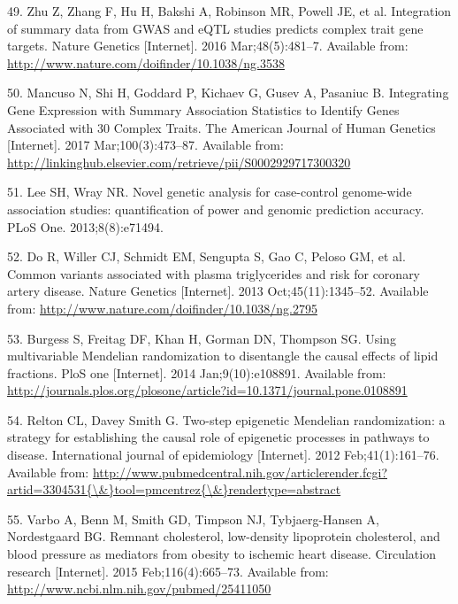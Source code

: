 \documentclass[]{article}
\begin{document}
\hypertarget{ref-Zhu2016}{}
49. Zhu Z, Zhang F, Hu H, Bakshi A, Robinson MR, Powell JE, et al.
Integration of summary data from GWAS and eQTL studies predicts complex
trait gene targets. Nature Genetics {[}Internet{]}. 2016
Mar;48(5):481--7. Available from:
\url{http://www.nature.com/doifinder/10.1038/ng.3538}

\hypertarget{ref-Mancuso2017}{}
50. Mancuso N, Shi H, Goddard P, Kichaev G, Gusev A, Pasaniuc B.
Integrating Gene Expression with Summary Association Statistics to
Identify Genes Associated with 30 Complex Traits. The American Journal
of Human Genetics {[}Internet{]}. 2017 Mar;100(3):473--87. Available
from:
\url{http://linkinghub.elsevier.com/retrieve/pii/S0002929717300320}

\hypertarget{ref-Lee2013c}{}
51. Lee SH, Wray NR. Novel genetic analysis for case-control genome-wide
association studies: quantification of power and genomic prediction
accuracy. PLoS One. 2013;8(8):e71494.

\hypertarget{ref-Do2013}{}
52. Do R, Willer CJ, Schmidt EM, Sengupta S, Gao C, Peloso GM, et al.
Common variants associated with plasma triglycerides and risk for
coronary artery disease. Nature Genetics {[}Internet{]}. 2013
Oct;45(11):1345--52. Available from:
\url{http://www.nature.com/doifinder/10.1038/ng.2795}

\hypertarget{ref-Burgess2014a}{}
53. Burgess S, Freitag DF, Khan H, Gorman DN, Thompson SG. Using
multivariable Mendelian randomization to disentangle the causal effects
of lipid fractions. PloS one {[}Internet{]}. 2014 Jan;9(10):e108891.
Available from:
\url{http://journals.plos.org/plosone/article?id=10.1371/journal.pone.0108891}

\hypertarget{ref-Relton2012}{}
54. Relton CL, Davey Smith G. Two-step epigenetic Mendelian
randomization: a strategy for establishing the causal role of epigenetic
processes in pathways to disease. International journal of epidemiology
{[}Internet{]}. 2012 Feb;41(1):161--76. Available from:
\href{http://www.pubmedcentral.nih.gov/articlerender.fcgi?artid=3304531\%7B/\&\%7Dtool=pmcentrez\%7B/\&\%7Drendertype=abstract}{http://www.pubmedcentral.nih.gov/articlerender.fcgi?artid=3304531\{\textbackslash{}\&\}tool=pmcentrez\{\textbackslash{}\&\}rendertype=abstract}

\hypertarget{ref-Varbo2015}{}
55. Varbo A, Benn M, Smith GD, Timpson NJ, Tybjaerg-Hansen A,
Nordestgaard BG. Remnant cholesterol, low-density lipoprotein
cholesterol, and blood pressure as mediators from obesity to ischemic
heart disease. Circulation research {[}Internet{]}. 2015
Feb;116(4):665--73. Available from:
\url{http://www.ncbi.nlm.nih.gov/pubmed/25411050}
\end{document}
